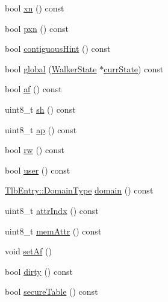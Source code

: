 \begin{DoxyCompactItemize}
\item 
bool \hyperlink{classArmISA_1_1TableWalker_1_1LongDescriptor_a88a5985b2a6224e7b546fa088b101d66}{xn} () const 
\item 
bool \hyperlink{classArmISA_1_1TableWalker_1_1LongDescriptor_a2f27c1539208f00f43df19d64c5841ff}{pxn} () const 
\item 
bool \hyperlink{classArmISA_1_1TableWalker_1_1LongDescriptor_a2dab8ca48cab365e5e6b7b75e34996cc}{contiguousHint} () const 
\item 
bool \hyperlink{classArmISA_1_1TableWalker_1_1LongDescriptor_ad6798ebc36be05efa22b3fb9f3702d83}{global} (\hyperlink{classArmISA_1_1TableWalker_1_1WalkerState}{WalkerState} $\ast$\hyperlink{classArmISA_1_1TableWalker_a5d1a85a0248e318a8191d54988c8782d}{currState}) const 
\item 
bool \hyperlink{classArmISA_1_1TableWalker_1_1LongDescriptor_a8f028be885d2543df6e8a1278a54d30b}{af} () const 
\item 
uint8\_\-t \hyperlink{classArmISA_1_1TableWalker_1_1LongDescriptor_a3446eaca4d3fe88011cc2ed1aceba481}{sh} () const 
\item 
uint8\_\-t \hyperlink{classArmISA_1_1TableWalker_1_1LongDescriptor_a4fc87654615da601dbbc3cb6dd1046ee}{ap} () const 
\item 
bool \hyperlink{classArmISA_1_1TableWalker_1_1LongDescriptor_a356d85e4835c16b7b097ddd75df5cfbf}{rw} () const 
\item 
bool \hyperlink{classArmISA_1_1TableWalker_1_1LongDescriptor_a9616ae36375179bd5d3eef61584021fe}{user} () const 
\item 
\hyperlink{structArmISA_1_1TlbEntry_a0595b41cfb7d03f18438f9c355a3469d}{TlbEntry::DomainType} \hyperlink{classArmISA_1_1TableWalker_1_1LongDescriptor_a949a36eac4ce1b6aa2afd933e7e74710}{domain} () const 
\item 
uint8\_\-t \hyperlink{classArmISA_1_1TableWalker_1_1LongDescriptor_a4aa987f33acae31f584caac0c5243b4b}{attrIndx} () const 
\item 
uint8\_\-t \hyperlink{classArmISA_1_1TableWalker_1_1LongDescriptor_a2f2b83b47e2b95cea95fef8964ccb96e}{memAttr} () const 
\item 
void \hyperlink{classArmISA_1_1TableWalker_1_1LongDescriptor_aac2b49da99f498c6a7a8fecec04c7f1d}{setAf} ()
\item 
bool \hyperlink{classArmISA_1_1TableWalker_1_1LongDescriptor_ade104a269a8f8f3ef5ded192aede7991}{dirty} () const 
\item 
bool \hyperlink{classArmISA_1_1TableWalker_1_1LongDescriptor_aadb8f0e48c9256e28618be47ef61f681}{secureTable} () const 

\end{DoxyCompactItemize}
